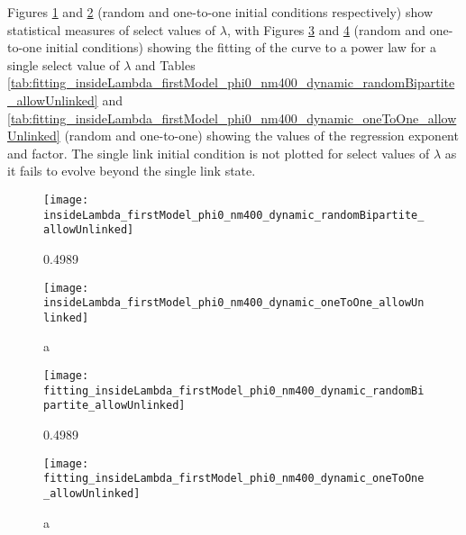 Figures \ref{fig:insideLambda_firstModel_phi0_nm400_dynamic_randomBipartite_allowUnlinked} and \ref{fig:insideLambda_firstModel_phi0_nm400_dynamic_oneToOne_allowUnlinked} (random and one-to-one initial conditions respectively) show statistical measures of select values of $\lambda$, with Figures \ref{fig:fitting_insideLambda_firstModel_phi0_nm400_dynamic_randomBipartite_allowUnlinked} and \ref{fig:fitting_insideLambda_firstModel_phi0_nm400_dynamic_oneToOne_allowUnlinked} (random and one-to-one initial conditions) showing the fitting of the curve to a power law for a single select value of $\lambda$ and Tables \ref{tab:fitting_insideLambda_firstModel_phi0_nm400_dynamic_randomBipartite_allowUnlinked} and \ref{tab:fitting_insideLambda_firstModel_phi0_nm400_dynamic_oneToOne_allowUnlinked} (random and one-to-one) showing the values of the regression exponent and factor.
The single link initial condition is not plotted for select values of $\lambda$ as it fails to evolve beyond the single link state.

\begin{figure}
  \centering
  \texttt{[image: insideLambda\_firstModel\_phi0\_nm400\_dynamic\_randomBipartite\_allowUnlinked]}
  \caption{0.4989}
  \label{fig:insideLambda_firstModel_phi0_nm400_dynamic_randomBipartite_allowUnlinked}
\end{figure}

\begin{figure}
  \centering
  \texttt{[image: insideLambda\_firstModel\_phi0\_nm400\_dynamic\_oneToOne\_allowUnlinked]}
  \caption{a}
  \label{fig:insideLambda_firstModel_phi0_nm400_dynamic_oneToOne_allowUnlinked}
\end{figure}

\begin{figure}
  \centering
  \texttt{[image: fitting\_insideLambda\_firstModel\_phi0\_nm400\_dynamic\_randomBipartite\_allowUnlinked]}
  \caption{0.4989}
  \label{fig:fitting_insideLambda_firstModel_phi0_nm400_dynamic_randomBipartite_allowUnlinked}
\end{figure}

\begin{figure}
  \centering
  \texttt{[image: fitting\_insideLambda\_firstModel\_phi0\_nm400\_dynamic\_oneToOne\_allowUnlinked]}
  \caption{a}
  \label{fig:fitting_insideLambda_firstModel_phi0_nm400_dynamic_oneToOne_allowUnlinked}
\end{figure}



